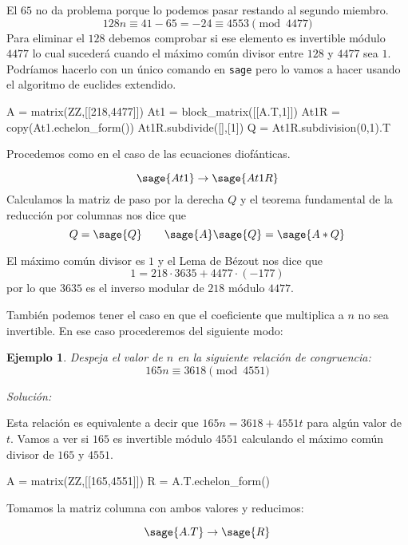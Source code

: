 \documentclass{amsart}
\newtheorem{ejem}{Ejemplo}
\begin{document}

El $65$ no da problema porque lo podemos pasar restando al segundo miembro.
$$ 128 n \equiv 41 - 65 = -24 \equiv 4553 \pmod{4477}$$
Para eliminar el $128$ debemos comprobar si ese elemento es invertible 
módulo $4477$ lo cual sucederá cuando el máximo común divisor entre $128$ y 
$4477$ sea $1$. Podríamos hacerlo con un único comando en \verb|sage| pero 
lo vamos a hacer usando el algoritmo de euclides extendido.

\begin{sageblock}
A = matrix(ZZ,[[218,4477]])
At1 = block_matrix([[A.T,1]])
At1R = copy(At1.echelon_form())
At1R.subdivide([],[1])
Q = At1R.subdivision(0,1).T
\end{sageblock}

Procedemos como en el caso de las ecuaciones diofánticas. 

$$\sage{At1} \to \sage{At1R}$$
Calculamos la matriz de paso por la derecha $Q$ y el teorema fundamental 
de la reducción por columnas nos dice que 
$$Q = \sage{Q} \qquad \sage{A} \sage{Q} = \sage{A*Q}$$

El máximo común divisor es $1$ y el Lema de Bézout nos dice que 
$$ 1 = 218 \cdot 3635 + 4477 \cdot (-177) $$
por lo que $3635$ es el inverso modular de $218$ módulo $4477$.


También podemos tener el caso en que el coeficiente que multiplica a $n$
no sea invertible. En ese caso procederemos del siguiente modo:

\begin{ejem}
Despeja el valor de $n$ en la siguiente relación de congruencia:
$$ 165 n \equiv 3618 \pmod{4551} $$
\end{ejem}

{\it Solución: }


Esta relación es equivalente a decir que $165n = 3618+4551t$ para algún
valor de $t$. Vamos a ver si $165$ es invertible módulo $4551$ calculando
el máximo común divisor de $165$ y $4551$.

\begin{sageblock}
A = matrix(ZZ,[[165,4551]])
R = A.T.echelon_form()
\end{sageblock}

Tomamos la matriz columna con ambos valores y reducimos:

$$ \sage{A.T} \to \sage{R}$$
\end{document}
